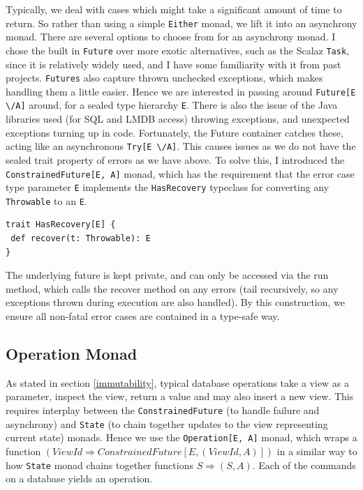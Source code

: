 \documentclass[12pt,a4paper,twoside,openright]{report}
\newcommand\codeName[1]{\texttt{#1}}
\newcommand\either[0]{\textbackslash/}
\renewcommand{\baselinestretch}{1.1}    %
\begin{document}
Typically, we deal with cases which might take a significant amount of time to return. So rather than using a simple \codeName{Either} monad, we lift it into an asynchrony monad. There are several options to choose from for an asynchrony monad. I chose the built in \codeName{Future} over more exotic alternatives, such as the Scalaz \codeName{Task}, since it is relatively widely used, and I have some familiarity with it from past projects. \codeName{Futures} also capture thrown unchecked exceptions, which makes handling them a little easier. Hence we are interested in passing around \codeName{Future[E \either A]} around, for a sealed type hierarchy \codeName{E}. There is also the issue of the Java libraries used (for SQL and LMDB access) throwing exceptions, and unexpected exceptions turning up in code. Fortunately, the  Future container catches these, acting like an asynchronous \codeName{Try[E \either A]}. This causes issues as we do not have the sealed trait property of errors as we have above. To solve this, I introduced the \codeName{ConstrainedFuture[E, A]} monad, which has the requirement that the error case type parameter \codeName{E} implements the \codeName{HasRecovery} typeclass for converting any \codeName{Throwable} to an \codeName{E}.

\renewcommand{\baselinestretch}{0.8}
\begin{framed}
	\begin{verbatim}
trait HasRecovery[E] {
 def recover(t: Throwable): E
}
	\end{verbatim}
\end{framed}
\renewcommand{\baselinestretch}{1.1}

The underlying future is kept private, and can only be accessed via the run method, which calls the recover method on any errors (tail recursively, so any exceptions thrown during execution are also handled). By this construction, we ensure all non-fatal error cases are contained in a type-safe way.

	\subsection{Operation Monad}
	As stated in section \ref{immutability}, typical database operations take a view as a parameter, inspect the view, return a value and may also insert a new view. This requires interplay between the \codeName{ConstrainedFuture} (to handle failure and asynchrony) and \codeName{State} (to chain together updates to the view representing current state) monads. Hence we use the \codeName{Operation[E, A]} monad, which wraps a function \codeName{$(ViewId \Rightarrow ConstrainedFuture[E, (ViewId, A)])$} in a similar way to how \codeName{State} monad chains together functions \codeName{$S \Rightarrow (S, A)$}. Each of the commands on a database yields an operation.
\end{document}
